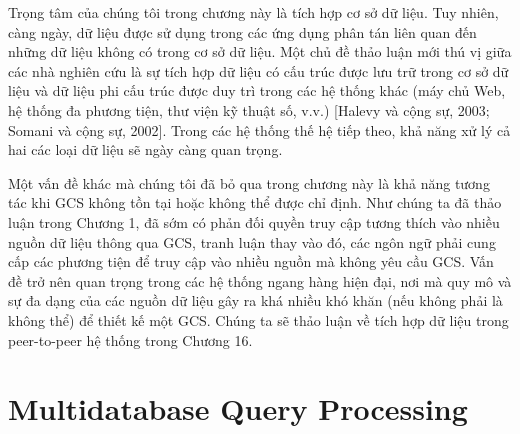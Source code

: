 \documentclass[a4paper]{article}
\begin{document}
Trọng tâm của chúng tôi trong chương này là tích hợp cơ sở dữ liệu. Tuy nhiên, càng ngày,
dữ liệu được sử dụng trong các ứng dụng phân tán liên quan đến những dữ liệu không có trong
cơ sở dữ liệu. Một chủ đề thảo luận mới thú vị giữa các nhà nghiên cứu là sự tích hợp
dữ liệu có cấu trúc được lưu trữ trong cơ sở dữ liệu và dữ liệu phi cấu trúc được duy trì
trong các hệ thống khác (máy chủ Web, hệ thống đa phương tiện, thư viện kỹ thuật số, v.v.) [Halevy
và cộng sự, 2003; Somani và cộng sự, 2002]. Trong các hệ thống thế hệ tiếp theo, khả năng xử lý cả hai
các loại dữ liệu sẽ ngày càng quan trọng.

Một vấn đề khác mà chúng tôi đã bỏ qua trong chương này là khả năng tương tác khi GCS
không tồn tại hoặc không thể được chỉ định. Như chúng ta đã thảo luận trong Chương 1, đã sớm có
phản đối quyền truy cập tương thích vào nhiều nguồn dữ liệu thông qua GCS, tranh luận
thay vào đó, các ngôn ngữ phải cung cấp các phương tiện để truy cập vào nhiều
nguồn mà không yêu cầu GCS. Vấn đề trở nên quan trọng trong các hệ thống ngang hàng hiện đại, nơi mà quy mô và sự đa dạng của các nguồn dữ liệu gây ra khá nhiều khó khăn
(nếu không phải là không thể) để thiết kế một GCS. Chúng ta sẽ thảo luận về tích hợp dữ liệu trong peer-to-peer
hệ thống trong Chương 16.

\newpage

\section{Multidatabase Query Processing}
\end{document}
